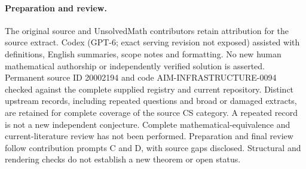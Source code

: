 \documentclass[11pt]{article}
\begin{document}
\paragraph{Preparation and review.}
The original source and UnsolvedMath contributors retain attribution for the source extract. Codex (GPT-6; exact serving revision not exposed) assisted with definitions, English summaries, scope notes and formatting. No new human mathematical authorship or independently verified solution is asserted. Permanent source ID 20002194 and code AIM-INFRASTRUCTURE-0094 checked against the complete supplied registry and current repository. Distinct upstream records, including repeated questions and broad or damaged extracts, are retained for complete coverage of the source CS category. A repeated record is not a new independent conjecture. Complete mathematical-equivalence and current-literature review has not been performed. Preparation and final review follow contribution prompts C and D, with source gaps disclosed. Structural and rendering checks do not establish a new theorem or open status.
\label{end:20002194}
\end{document}
